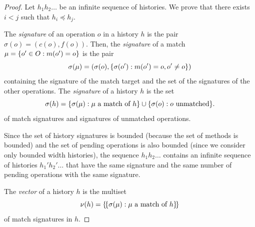 \begin{proof}

%
%

Let $h_1 h_2\ldots $ be an infinite sequence of histories. We prove that there exists $i<j$ such that $h_i\preceq h_j$.

The \emph{signature} of an operation $o$ in a history $h$ is the pair $\sigma(o)=(c(o),f(o))$.
Then, the \emph{signature} of a match $\mu={\{{ o' \in O : m(o') = o}\}}$ is the pair 
\[
\sigma(\mu)=(\sigma(o),{\{{\sigma(o') : m(o')=o, o'\neq o}\}})
\]
containing the signature of the match target and the set of the signatures of the other operations.
The \emph{signature} of a history $h$ is the set 
\[
\sigma(h)={\{{\sigma(\mu): \mu\mbox{ a match of $h$}}\}}\cup{\{{\sigma(o): o\mbox{ unmatched}}\}}.
\]
of match signatures and signatures of unmatched operations.

Since the set of history signatures is bounded (because the set of methods is bounded)
and the set of pending operations is also bounded (since we consider only bounded width histories),
the sequence $h_1 h_2\ldots $ contains an infinite sequence of histories $h_1' h_2' \ldots$ that have 
the same signature and the same number of pending operations with the same signature.

The \emph{vector} of a history $h$ is the multiset 
\[
\nu(h)={\{\!\{ \sigma(\mu): \mu\mbox{ a match of $h$} \}\!\}}
\]
of match signatures in $h$.


\end{proof}
